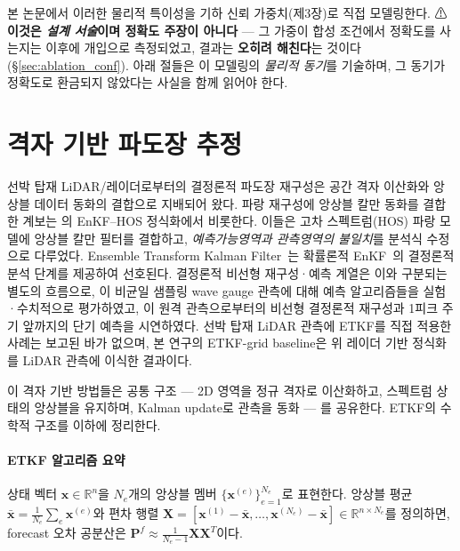 \documentclass[11pt]{report}
\numberwithin{equation}{chapter}
\numberwithin{figure}{chapter}
\numberwithin{table}{chapter}
\begin{document}
본 논문에서 이러한 물리적 특이성을 기하 신뢰 가중치(제3장)로
직접 모델링한다.
⚠\textbf{이것은 \emph{설계 서술}이며 정확도 주장이 아니다} --- 그 가중이 합성 조건에서
정확도를 사는지는 이후에 개입으로 측정되었고, 결과는 \textbf{오히려 해친다}는 것이다
(\S\ref{sec:ablation_conf}). 아래 절들은 이 모델링의 \emph{물리적 동기}를 기술하며,
그 동기가 정확도로 환금되지 않았다는 사실을 함께 읽어야 한다.

\section{격자 기반 파도장 추정}
\label{sec:grid_methods}

선박 탑재 LiDAR/레이더로부터의 결정론적 파도장 재구성은
공간 격자 이산화와 앙상블 데이터 동화의 결합으로 지배되어 왔다.
파랑 재구성에 앙상블 칼만 동화를 결합한 계보는 \citet{WangPan2021}의 EnKF--HOS 정식화에서
비롯한다. 이들은 고차 스펙트럼(HOS) 파랑 모델에 앙상블 칼만 필터를 결합하고,
\emph{예측가능영역과 관측영역의 불일치}를 분석식 수정으로 다루었다.
Ensemble Transform Kalman Filter~\citep{Hunt2007}는 확률론적
EnKF~\citep{Evensen2003}의 결정론적 분석 단계를 제공하여 선호된다.
결정론적 비선형 재구성·예측 계열은 이와 구분되는 별도의 흐름으로,
\citet{Desmars2020}이 비균일 샘플링 wave gauge 관측에 대해 예측 알고리즘들을
실험·수치적으로 평가하였고, \citet{Desmars2023}이 원격 관측으로부터의
비선형 결정론적 재구성과 1피크 주기 앞까지의 단기 예측을 시연하였다. 선박 탑재 LiDAR
관측에 ETKF를 직접 적용한 사례는 보고된 바가 없으며, 본 연구의 ETKF-grid
baseline은 위 레이더 기반 정식화를 LiDAR 관측에 이식한 결과이다.

이 격자 기반 방법들은 공통 구조 --- 2D 영역을 정규 격자로 이산화하고,
스펙트럼 상태의 앙상블을 유지하며, Kalman update로 관측을 동화 --- 를 공유한다.
ETKF의 수학적 구조를 이하에 정리한다.

\paragraph{ETKF 알고리즘 요약}
상태 벡터 $\mathbf{x} \in \mathbb{R}^n$을 $N_e$개의 앙상블 멤버
$\{\mathbf{x}^{(e)}\}_{e=1}^{N_e}$로 표현한다.
앙상블 평균 $\bar{\mathbf{x}} = \frac{1}{N_e}\sum_{e}\mathbf{x}^{(e)}$와
편차 행렬 $\mathbf{X} = [\mathbf{x}^{(1)} - \bar{\mathbf{x}}, \ldots,
\mathbf{x}^{(N_e)} - \bar{\mathbf{x}}] \in \mathbb{R}^{n \times N_e}$를 정의하면,
forecast 오차 공분산은 $\mathbf{P}^f \approx \frac{1}{N_e - 1}\mathbf{X}\mathbf{X}^T$이다.
\end{document}
